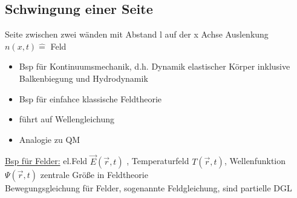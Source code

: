 \documentclass[titlepage,12pt,a4paper,ngerman]{report}
\begin{document}
{\subsection{Schwingung einer Seite}
Seite zwischen zwei wänden mit Abstand l auf der x Achse
Auslenkung $ n(x,t) \widehat{=} $ Feld
\begin{itemize}
	\item Bsp für Kontinuumsmechanik, d.h. Dynamik elastischer Körper inklusive Balkenbiegung und Hydrodynamik
	\item Bsp für einfahce klassische Feldtheorie
	\item führt auf Wellengleichung
	\item Analogie zu QM
\end{itemize}

\underline{Bsp für Felder:} el.Feld $ \vec{E}(\vec{r},t) $ , Temperaturfeld $ T(\vec{r},t) $, Wellenfunktion $ \Psi(\vec{r},t) $ zentrale Größe in Feldtheorie\\
Bewegungsgleichung für Felder, sogenannte Feldgleichung, sind partielle DGL\\
}
\end{document}
